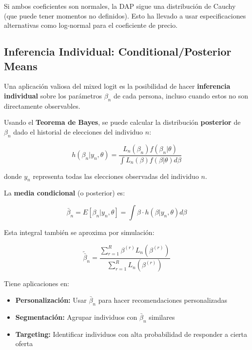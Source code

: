 \documentclass[
]{book}
\providecommand{\tightlist}{%
  \setlength{\itemsep}{0pt}\setlength{\parskip}{0pt}}
\begin{document}
Si ambos coeficientes son normales, la DAP sigue una distribución de Cauchy (que puede tener momentos no definidos). Esto ha llevado a usar especificaciones alternativas como log-normal para el coeficiente de precio.

\hypertarget{inferencia-individual-conditionalposterior-means}{%
\subsection{Inferencia Individual: Conditional/Posterior Means}\label{inferencia-individual-conditionalposterior-means}}

Una aplicación valiosa del mixed logit es la posibilidad de hacer \textbf{inferencia individual} sobre los parámetros \(\beta_n\) de cada persona, incluso cuando estos no son directamente observables.

Usando el \textbf{Teorema de Bayes}, se puede calcular la distribución \textbf{posterior} de \(\beta_n\) dado el historial de elecciones del individuo \(n\):

\begin{equation}
h(\beta_n | y_n, \theta) = \frac{L_n(\beta_n) f(\beta_n | \theta)}{\int L_n(\beta) f(\beta | \theta) d\beta}
\label{eq:posterior}
\end{equation}

donde \(y_n\) representa todas las elecciones observadas del individuo \(n\).

La \textbf{media condicional} (o posterior) es:

\begin{equation}
\bar{\beta}_n = E[\beta_n | y_n, \theta] = \int \beta \cdot h(\beta | y_n, \theta) d\beta
\label{eq:condmean}
\end{equation}

Esta integral también se aproxima por simulación:

\begin{equation}
\tilde{\bar{\beta}}_n = \frac{\sum_{r=1}^R \beta^{(r)} L_n(\beta^{(r)})}{\sum_{r=1}^R L_n(\beta^{(r)})}
\label{eq:simcondmean}
\end{equation}

Tiene aplicaciones en:

\begin{itemize}
\tightlist
\item
  \textbf{Personalización:} Usar \(\bar{\beta}_n\) para hacer recomendaciones personalizadas
\item
  \textbf{Segmentación:} Agrupar individuos con \(\bar{\beta}_n\) similares
\item
  \textbf{Targeting:} Identificar individuos con alta probabilidad de responder a cierta oferta
\end{itemize}
\end{document}
